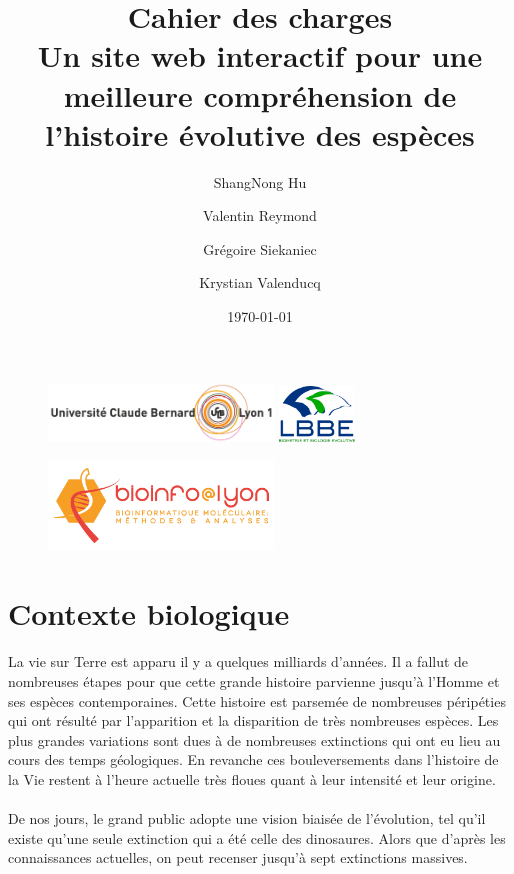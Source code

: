 \documentclass[a4paper]{article}
\title{{\sc \large Cahier des charges}\\
\bf Un site web interactif pour une meilleure compréhension de l’histoire évolutive des espèces}
\author{ShangNong {\sc Hu}\and Valentin {\sc Reymond}\and Grégoire {\sc Siekaniec}\and Krystian {\sc Valenducq}}
\date\today
\begin{document}
\begin{figure}[!t]
	\centering
	\includegraphics[width=6cm]{./img/ucbl.png}
	\hspace{\fill}
	\includegraphics[width=2cm]{./img/lbbe.png}
\end{figure}

\maketitle
\thispagestyle{empty}

\begin{figure}[!b]
	\centering
	\includegraphics[width=6cm]{./img/logo.png}
\end{figure}

\newpage

\tableofcontents
\newpage


\section{Contexte biologique}
	\paragraph{}
	La vie sur Terre est apparu il y a quelques milliards d'années. Il a fallut de nombreuses étapes pour que cette grande histoire parvienne jusqu'à l'Homme et ses espèces contemporaines. Cette histoire est parsemée de nombreuses péripéties qui ont résulté par l'apparition et la disparition de très nombreuses espèces. Les plus grandes variations sont dues à de nombreuses extinctions qui ont eu lieu au cours des temps géologiques. En revanche ces bouleversements dans l'histoire de la Vie restent à l'heure actuelle très floues quant à leur intensité et leur origine.

	\paragraph{}
	De nos jours, le grand public adopte une vision biaisée de l'évolution, tel qu'il existe qu'une seule extinction qui a été celle des dinosaures. Alors que d'après les connaissances actuelles, on peut recenser jusqu'à sept extinctions massives. 
\end{document}

